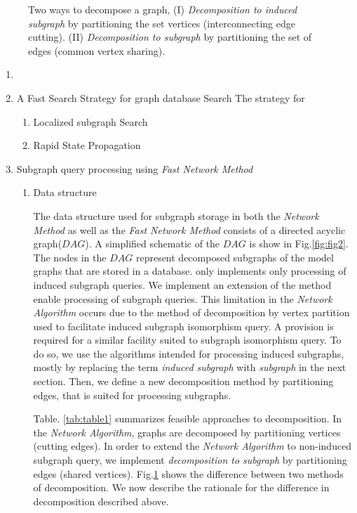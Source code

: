 \begin{figure}
\centering

\caption{Two ways to decompose a graph, (I) \textit{Decomposition to induced subgraph} by partitioning the set vertices (interconnecting edge cutting). (II) \textit{Decomposition to subgraph} by partitioning the set of edges (common vertex sharing).}
\label{fig:fig55}
\end{figure}

\begin{enumerate}
\item 

\item A Fast Search Strategy for graph database Search
The strategy  for 
\begin{enumerate}
\item{Localized subgraph Search}


\item{Rapid State Propagation}

\end{enumerate}

\item  Subgraph query processing using \textit{Fast Network Method}

\begin{enumerate}

\item Data structure

The data structure used for subgraph storage in both the \textit{Network Method} as well as the \textit{Fast Network Method} consists of a directed acyclic graph($DAG$). 
A simplified schematic of the $DAG$ is show in Fig.\ref{fig:fig2}. 
The nodes in the $DAG$ represent decomposed subgraphs of the model graphs that are stored in a database. 
only implements only processing of induced subgraph queries. 
We implement an extension of the method enable processing of subgraph queries. 
This limitation in the \textit{Network Algorithm} occurs due to the method of decomposition by vertex partition used to facilitate induced subgraph isomorphism query. 
A provision is required for a similar facility suited to subgraph isomorphism query. 
To do so, we use the algorithms intended for processing induced subgraphs, mostly by replacing the term \textit{induced subgraph} with \textit{subgraph} in the next section.
Then, we define a new decomposition method by partitioning edges, that is suited for processing subgraphs.


Table. \ref{tab:table1} summarizes feasible approaches to decomposition. 
In the \textit{Network Algorithm}, graphs are decomposed by partitioning vertices (cutting edges).
In order to extend the \textit{Network Algorithm} to non-induced subgraph query, we implement \textit{decomposition to subgraph} by partitioning edges (shared vertices). 
Fig.\ref{fig:fig55} shows the difference between two methods of decomposition. 
We now describe the rationale for the difference in decomposition described above.


\end{enumerate}
\end{enumerate}
